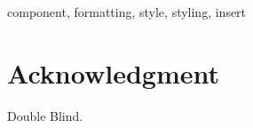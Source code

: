\documentclass[conference]{IEEEtran}
\begin{document}
\begin{IEEEkeywords}
component, formatting, style, styling, insert
\end{IEEEkeywords}














\section*{Acknowledgment}
Double Blind.
\\~
\nocite{FILL_ME_IN} %


\end{document}

